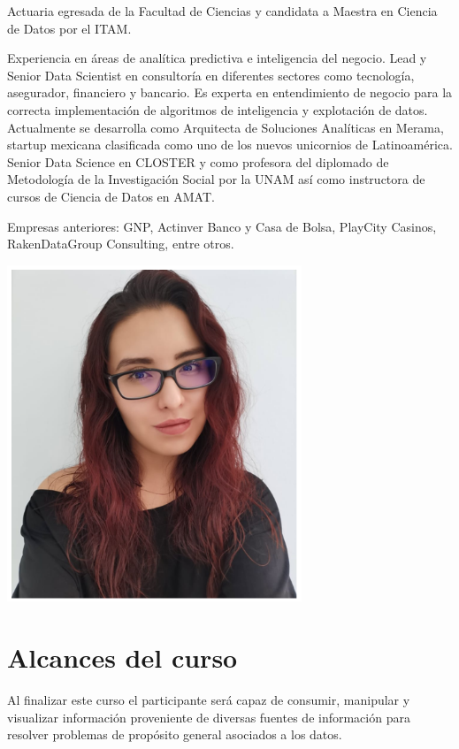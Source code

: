 \documentclass[
]{book}
\begin{document}
Actuaria egresada de la Facultad de Ciencias y candidata a Maestra en
Ciencia de Datos por el ITAM.

Experiencia en áreas de analítica predictiva e inteligencia del negocio. Lead y Senior
Data Scientist en consultoría en diferentes sectores como tecnología, asegurador,
financiero y bancario. Es experta en entendimiento de negocio para la correcta
implementación de algoritmos de inteligencia y explotación de datos.
Actualmente se desarrolla como Arquitecta de Soluciones Analíticas en Merama,
startup mexicana clasificada como uno de los nuevos unicornios de Latinoamérica.
Senior Data Science en CLOSTER y como profesora del diplomado de Metodología
de la Investigación Social por la UNAM así como instructora de cursos de Ciencia de
Datos en AMAT.

Empresas anteriores: GNP, Actinver Banco y Casa de Bolsa, PlayCity Casinos,
RakenDataGroup Consulting, entre otros.

\begin{center}\includegraphics[width=250pt]{img/00-presentacion/lizzy} \end{center}

\hypertarget{alcances-del-curso}{%
\section*{Alcances del curso}\label{alcances-del-curso}}

Al finalizar este curso el participante será capaz de consumir, manipular y visualizar información proveniente de diversas fuentes de información para resolver problemas de propósito general asociados a los datos.
\end{document}
